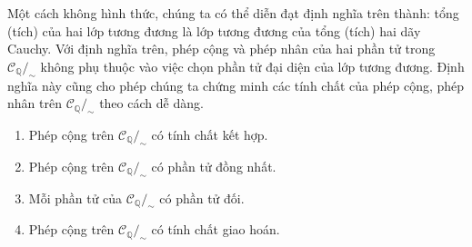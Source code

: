 Một cách không hình thức, chúng ta có thể diễn đạt định nghĩa trên thành: tổng (tích) của hai lớp tương đương là lớp tương đương của tổng (tích) hai dãy Cauchy. Với định nghĩa trên, phép cộng và phép nhân của hai phần tử trong $\mathscr{C}_{\mathbb{Q}}/_{\sim}$ không phụ thuộc vào việc chọn phần tử đại diện của lớp tương đương. Định nghĩa này cũng cho phép chúng ta chứng minh các tính chất của phép cộng, phép nhân trên $\mathscr{C}_{\mathbb{Q}}/_{\sim}$ theo cách dễ dàng.

\begin{appendixthm}
    \begin{enumerate}[label={(\roman*)}]
        \item Phép cộng trên $\mathscr{C}_{\mathbb{Q}}/_{\sim}$ có tính chất kết hợp.
        \item Phép cộng trên $\mathscr{C}_{\mathbb{Q}}/_{\sim}$ có phần tử đồng nhất.
        \item Mỗi phần tử của $\mathscr{C}_{\mathbb{Q}}/_{\sim}$ có phần tử đối.
        \item Phép cộng trên $\mathscr{C}_{\mathbb{Q}}/_{\sim}$ có tính chất giao hoán.
    \end{enumerate}
\end{appendixthm}

